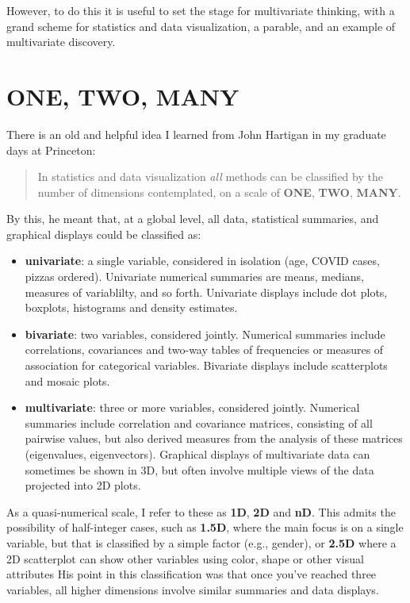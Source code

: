 \documentclass[
  letterpaper,
  10pt,
  krantz2]{krantz}
\providecommand{\tightlist}{%
  \setlength{\itemsep}{0pt}\setlength{\parskip}{0pt}}\usepackage{longtable,booktabs,array}
\begin{document}
However, to do this it is useful to set the stage for multivariate
thinking, with a grand scheme for statistics and data visualization, a
parable, and an example of multivariate discovery.

\section*{ONE, TWO, MANY}\label{one-two-many}


There is an old and helpful idea I learned from John Hartigan in my
graduate days at Princeton:

\begin{quote}
In statistics and data visualization \emph{all} methods can be
classified by the number of dimensions contemplated, on a scale of
\textbf{ONE}, \textbf{TWO}, \textbf{MANY}.
\end{quote}

By this, he meant that, at a global level, all data, statistical
summaries, and graphical displays could be classified as:

\begin{itemize}
\tightlist
\item
  \textbf{univariate}: a single variable, considered in isolation (age,
  COVID cases, pizzas ordered). Univariate numerical summaries are
  means, medians, measures of variablilty, and so forth. Univariate
  displays include dot plots, boxplots, histograms and density
  estimates.
\item
  \textbf{bivariate}: two variables, considered jointly. Numerical
  summaries include correlations, covariances and two-way tables of
  frequencies or measures of association for categorical variables.
  Bivariate displays include scatterplots and mosaic plots.
\item
  \textbf{multivariate}: three or more variables, considered jointly.
  Numerical summaries include correlation and covariance matrices,
  consisting of all pairwise values, but also derived measures from the
  analysis of these matrices (eigenvalues, eigenvectors). Graphical
  displays of multivariate data can sometimes be shown in 3D, but often
  involve multiple views of the data projected into 2D plots.
\end{itemize}

As a quasi-numerical scale, I refer to these as \textbf{1D}, \textbf{2D}
and \textbf{nD}. This admits the possibility of half-integer cases, such
as \textbf{1.5D}, where the main focus is on a single variable, but that
is classified by a simple factor (e.g., gender), or \textbf{2.5D} where
a 2D scatterplot can show other variables using color, shape or other
visual attributes His point in this classification was that once you've
reached three variables, all higher dimensions involve similar summaries
and data displays.
\end{document}
